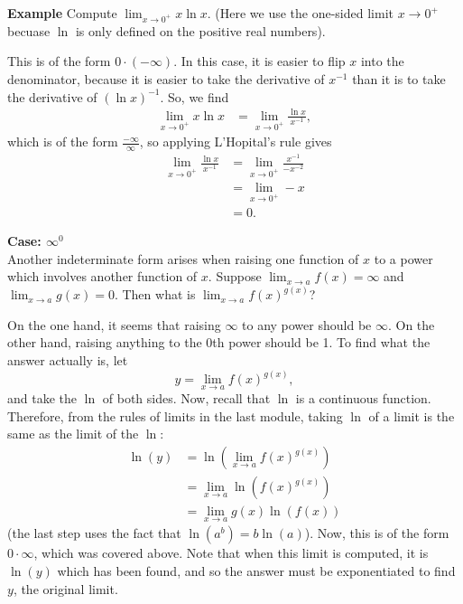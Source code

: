 \documentclass[a4paper]{book}
\begin{document}
\begin{sloppypar}
\textbf{Example} Compute $\displaystyle \lim_{x \rightarrow 0^+} x \ln x$. (Here we use the one-sided limit $x \rightarrow 0^+$ becuase $\ln$ is only defined on the positive real numbers).
\begin{examplebox}
This is of the form $0 \cdot (-\infty)$. In this case, it is easier to flip $x$ into the denominator, because it is easier to take the derivative of $x^{-1}$ than it is to take the derivative of $(\ln x)^{-1}$. So, we find
\begin{align*}
\lim_{x \rightarrow 0^+} x \ln x &= \lim_{x \rightarrow 0^+} \frac{ \ln x}{x^{-1}},
\end{align*}
which is of the form $\frac{-\infty}{\infty}$, so applying L'Hopital's rule gives
\begin{align*}
\lim_{x \rightarrow 0^+} \frac{ \ln x}{x^{-1}} &= \lim_{x \rightarrow 0^+} \frac{x^{-1}}{-x^{-2}} \\
&= \lim_{x \rightarrow 0^+} -x \\
&= 0.
\end{align*} 
\end{examplebox}
\bigbreak
\noindent \textbf{Case: $\infty^0$}\\

Another indeterminate form arises when raising one function of $x$ to a power which involves another function of $x$. Suppose $\displaystyle \lim_{x \rightarrow a} f(x) = \infty$ and $\displaystyle \lim_{x \rightarrow a} g(x) = 0$. Then what is $\displaystyle \lim_{x \rightarrow a} f(x)^{g\left(x\right)}$?

On the one hand, it seems that raising $\infty$ to any power should be $\infty$. On the other hand, raising anything to the 0th power should be 1. To find what the answer actually is, let \[ y = \lim_{x \rightarrow a} f(x)^{g\left(x\right)}, \] and take the $\ln$ of both sides. Now, recall that $\ln$ is a continuous function. Therefore, from the rules of limits in the last module, taking $\ln$ of a limit is the same as the limit of the $\ln$:
\begin{align*}
\ln(y) &= \ln\left(\lim_{x\rightarrow a} f(x)^{g\left(x\right)}\right) \\
&= \lim_{x \rightarrow a} \ln \left(f(x)^{g\left(x\right)}\right) \\
&= \lim_{x \rightarrow a} g(x) \ln(f(x))
\end{align*}
(the last step uses the fact that $\ln(a^b) = b\ln(a)$). Now, this is of the form $0 \cdot \infty$, which was covered above. Note that when this limit is computed, it is $\ln(y)$ which has been found, and so the answer must be exponentiated to find $y$, the original limit.


\end{sloppypar}
\end{document}
